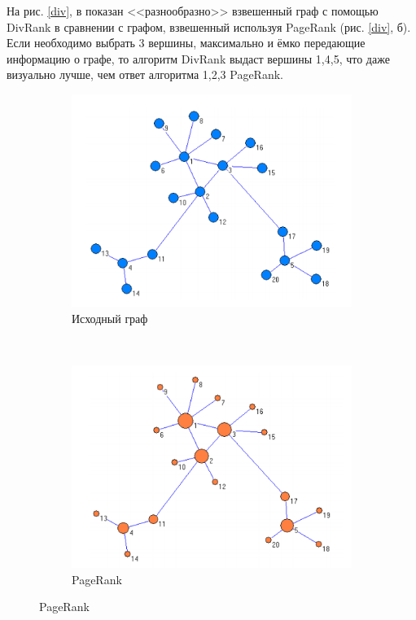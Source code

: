 \documentclass[a4paper, 14pt]{extarticle}
\begin{document}
На рис. \ref{div}, в показан <<разнообразно>> взвешенный граф с помощью DivRank в сравнении с графом, взвешенный используя PageRank (рис. \ref{div}, б). Если необходимо выбрать 3 вершины, максимально и ёмко передающие информацию о графе, то алгоритм DivRank выдаст вершины 1,4,5, что даже визуально лучше, чем ответ алгоритма 1,2,3 PageRank. 
\begin{figure}[h]
	\centering
	\begin{subfigure}[b]{0.3\textwidth}
		\includegraphics[width=\textwidth]{NoR}
		\caption{Исходный граф}
	\end{subfigure}
	~
	\begin{subfigure}[b]{0.3\textwidth}
		\includegraphics[width=\textwidth]{PageR}
		\caption{PageRank}

\end{subfigure}
\end{figure}
\end{document}
